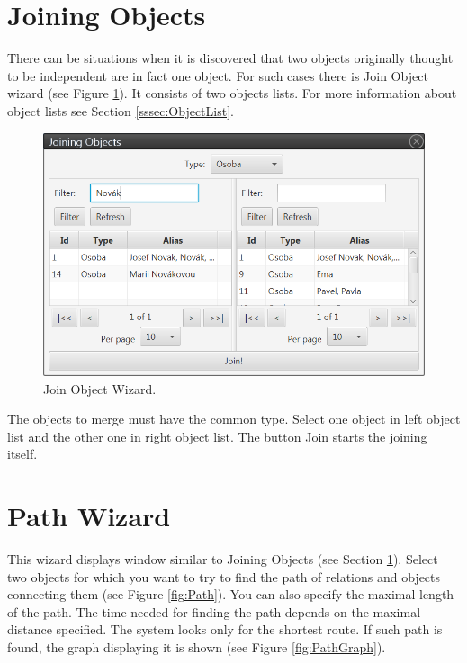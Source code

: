 \section{Joining Objects}
\label{ssec:JoinObjects}

There can be situations when it is discovered that two objects originally
thought to be independent are in fact one object. For such cases there is Join
Object wizard (see Figure \ref{fig:Join}). It consists of two objects lists. For
more information about object lists see Section \ref{sssec:ObjectList}.

\begin{figure}[!htb]
        \centering
        \includegraphics[width=\textwidth]{Images/join}
        \caption{Join Object Wizard.}
        \label{fig:Join}
\end{figure}

The objects to merge must have the common type. Select one object in left object
list and the other one in right object list. The button Join starts the joining
itself.

\section{Path Wizard}
\label{ssec:PathWizard}

This wizard displays window similar to Joining Objects (see Section
\ref{ssec:JoinObjects}). Select two objects for which you want to try to find
the path of relations and objects connecting them (see Figure \ref{fig:Path}).
You can also specify the maximal length of the path. The time needed for finding
the path depends on the maximal distance specified. The system looks only for
the shortest route. If such path is found, the graph displaying it is shown (see
Figure \ref{fig:PathGraph}).

